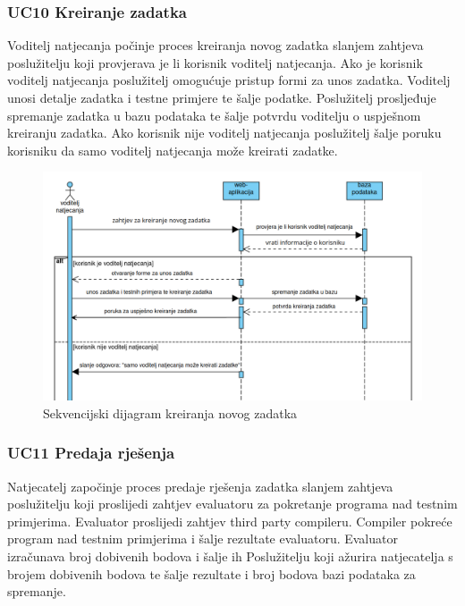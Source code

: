 				\clearpage 

				\subsubsection*{UC10 Kreiranje zadatka}
				
				Voditelj natjecanja počinje proces kreiranja novog zadatka slanjem zahtjeva poslužitelju koji provjerava je li korisnik voditelj natjecanja. Ako je korisnik voditelj natjecanja poslužitelj omogućuje pristup formi za unos zadatka. Voditelj unosi detalje zadatka i testne primjere te šalje podatke. Poslužitelj prosljeđuje spremanje zadatka u bazu podataka te šalje potvrdu voditelju o uspješnom kreiranju zadatka. Ako korisnik nije voditelj natjecanja poslužitelj šalje poruku korisniku da samo voditelj natjecanja može kreirati zadatke.
				\vspace{20mm}

				\begin{figure}[htbp]
					\centering
					\includegraphics[width=\linewidth]{slike/kreiranje_zadatka.png}
					\caption{Sekvencijski dijagram kreiranja novog zadatka}\label{fig:seqdiag_zadatka}
				\end{figure}
				
				
				\clearpage 
				
				\subsubsection*{UC11 Predaja rješenja}
				
				Natjecatelj započinje proces predaje rješenja zadatka slanjem zahtjeva poslužitelju koji proslijedi zahtjev evaluatoru za pokretanje programa nad testnim primjerima. Evaluator proslijedi zahtjev third party compileru. Compiler pokreće program nad testnim primjerima i šalje rezultate evaluatoru. Evaluator izračunava broj dobivenih bodova i šalje ih Poslužitelju koji ažurira natjecatelja s brojem dobivenih bodova te šalje rezultate i broj bodova bazi podataka za spremanje.
				\vspace{20mm}

